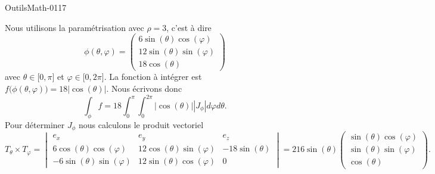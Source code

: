 
\begin{corrige}{OutilsMath-0117}

    Nous utilisons la paramétrisation avec \( \rho=3\), c'est à dire
    \begin{equation}
        \phi(\theta,\varphi)=\begin{pmatrix}
            6\sin(\theta)\cos(\varphi)    \\ 
            12\sin(\theta)\sin(\varphi)    \\ 
            18\cos(\theta)    
        \end{pmatrix}
    \end{equation}
    avec \( \theta\in\mathopen[ 0 , \pi \mathclose]\) et \( \varphi\in\mathopen[ 0 , 2\pi \mathclose]\). La fonction à intégrer est \( f\big( \phi(\theta,\varphi) \big)=18| \cos(\theta) |\). Nous écrivons donc
    \begin{equation}
        \int_{\phi}f=18\int_0^{\pi}\int_0^{2\pi}| \cos(\theta) | |J_{\phi} |d\varphi d\theta.
    \end{equation}
    Pour déterminer \( J_{\phi}\) nous calculons le produit vectoriel
    \begin{equation}
        T_{\theta}\times T_{\varphi}=\begin{vmatrix}
            e_x    &   e_y    &   e_z    \\
            6\cos(\theta)\cos(\varphi)    &  12\cos(\theta)\sin(\varphi)     &   -18\sin(\theta)    \\
            -6\sin(\theta)\sin(\varphi)    &   12\sin(\theta)\cos(\varphi)    &   0
        \end{vmatrix}=216\sin(\theta)\begin{pmatrix}
            \sin(\theta)\cos(\varphi)    \\ 
            \sin(\theta)\sin(\varphi)    \\ 
            \cos(\theta)    
        \end{pmatrix}.
    \end{equation}
    

\end{corrige}
